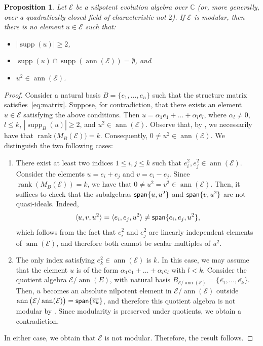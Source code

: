\documentclass[12pt,reqno]{amsart}
\theoremstyle{plain}%
\newtheorem{proposition}[theorem]{Proposition}%
\theoremstyle{definition}
\theoremstyle{remark}
\newcommand{\E}{\mathcal{E}}
\DeclareMathOperator{\ann}{ann}
\DeclareMathOperator{\spa}{\textup{\textsf{span}}}
\DeclareMathOperator{\rank}{rank}
\DeclareMathOperator{\supp}{supp}
\numberwithin{equation}{section}
\begin{document}
\begin{proposition}\label{prop:nec_mod}
Let $\E$ be a nilpotent evolution algebra over $\mathbb{C}$ (or, more generally, over a quadratically closed field of characteristic not $2$). If $\E$ is modular, then there is no element $u\in\E$ such that:
\begin{itemize}
	\item $|\supp(u)|\geq 2$,
	\item $\supp(u)\cap\supp(\ann(\E))=\emptyset$, and
	\item $u^2\in\ann(\E)$.
\end{itemize}
\end{proposition}
\begin{proof}
	Consider a natural basis $B=\{e_1,\dots,e_n\}$ such that the structure matrix satisfies~\eqref{eq:matrix}. Suppose, for contradiction, that there exists an element $u\in\E$ satisfying the above conditions. Then  $u=\alpha_{1}e_{1}+\dots+\alpha_{l}e_{l}$, where $\alpha_l\neq0$, $l\leq k$, $|\supp_B(u)|\geq2$, and $u^2\in\ann(\E)$. 
	Observe that, by \cite[Proposition~5.4]{LPP_25}, we necessarily have that $\rank\big(M_B(\mathcal{E})\big)=k$. Consequently,
	$0\neq u^2\in\ann(\E)$.  We distinguish the two following cases:
	\begin{enumerate}
		\item There exist at least two indices $1\leq i,j\leq k$ such that $e_i^2,e_j^2\in\ann(\E)$. Consider the elements $u=e_i+e_j$ and $v=e_i-e_j$. Since $\rank(M_B(\E))=k$, we have that $0\neq u^2=v^2\in\ann(\E)$. Then, it suffices to check that the subalgebras  $\spa\{u,u^2\}$ and $\spa\{v,u^2\}$ are not quasi-ideals. Indeed,
		\[\langle u,v,u^2\rangle=\langle e_i,e_j,u^2\rangle\neq\spa\{e_i,e_j,u^2\},\]
		which follows from the fact that $e_i^2$ and $e_j^2$ are linearly independent elements of $\ann(\E)$, and therefore both cannot be scalar multiples of $u^2$.
		\item The only index satisfying $e_k^2\in\ann(\E)$ is $k$. In this case, we may assume that the element $u$ is of the form $\alpha_1e_1+\dots+\alpha_le_l$ with $l<k$. Consider the quotient algebra $\E/\ann(E)$, with natural basis $B_{\E/\ann(\E)}=\{\overline{e_1},\dots,\overline{e_k}\}$. Then, $u$ becomes an absolute nilpotent element in $\E/\ann(\E)$ outside $\ann\big(\E/\ann(\E)\big)=\spa\{\overline{e_k}\}$, and therefore this quotient algebra is not modular by \cite[Proposition~5.4]{LPP_25}. Since modularity is preserved under quotients, we obtain a contradiction.
	\end{enumerate}
	In either case, we obtain that 
	$\E$ is not modular. Therefore, the result follows.
\end{proof}
\end{document}

